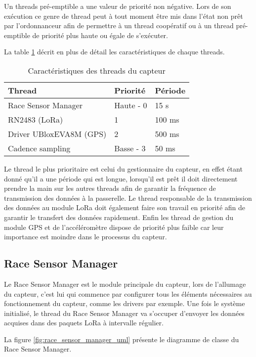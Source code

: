 Un threads pré-emptible a une valeur de priorité non négative. Lors de son exécution ce genre de thread peut à tout moment être mis dans l'état non prêt par l'ordonnanceur afin de permettre à un thread coopératif ou à un thread pré-emptible de priorité plus haute ou égale de s'exécuter. \cite{zephyr_web}

La table \ref{tab:threads_cara} décrit en plus de détail les caractéristiques de chaque threads.

\begin{table}[htb]
\caption{Caractéristiques des threads du capteur}
\label{tab:threads_cara}
\centering
\begin{tabular}{ l l l }
\toprule
Thread & Priorité & Période \\
\midrule
Race Sensor Manager & Haute - 0 & 15 s  \\
RN2483 (LoRa) & 1 & 100 ms  \\
Driver UBloxEVA8M (GPS) & 2 & 500 ms  \\
Cadence sampling & Basse - 3 & 50 ms  \\
\bottomrule 
\end{tabular}
\end{table}

Le thread le plus prioritaire est celui du gestionnaire du capteur, en effet étant donné qu'il a une période qui est longue, lorsqu'il est prêt il doit directement prendre la main sur les autres threads afin de garantir la fréquence de transmission des données à la passerelle.
Le thread responsable de la transmission des données au module LoRa doit également faire son travail en priorité afin de garantir le transfert des données rapidement.
Enfin les thread de gestion du module GPS et de l'accéléromètre dispose de priorité plus faible car leur importance est moindre dans le processus du capteur.

\subsection{Race Sensor Manager}

Le Race Sensor Manager est le module principale du capteur, lors de l'allumage du capteur, c'est lui qui commence par configurer tous les éléments nécessaires au fonctionnement du capteur, comme les drivers par exemple. Une fois le système initialisé, le thread du Race Sensor Manager va s'occuper d'envoyer les données acquises dans des paquets LoRa à intervalle régulier.

La figure \ref{fig:race_sensor_manager_uml} présente le diagramme de classe du Race Sensor Manager.

